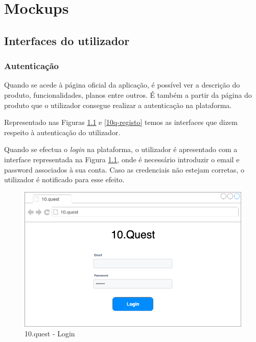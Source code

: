\chapter{Mockups}
\label{a:prototipos}


\section{Interfaces do utilizador}
\label{}

\subsection{Autenticação}

Quando se acede à página oficial da aplicação, é possível ver a descrição do produto, funcionalidades, planos entre outros. É também a partir da página do produto que o utilizador consegue realizar a autenticação na plataforma.

Representado nas Figuras \ref{10q-login} e \ref{10q-registo} temos as interfaces que dizem respeito à autenticação do utilizador.

Quando se efectua o \textit{login} na plataforma, o utilizador é apresentado com a interface representada na Figura \ref{10q-login}, onde é necessário introduzir o email e password associados à sua conta. Caso as credenciais não estejam corretas, o utilizador é notificado para esse efeito.



\begin{figure}[ht!]
	\begin{center}
		\includegraphics[width=1\textwidth]{img/prototipos/1.png}
		\caption{10.quest - Login}
		\label{10q-login}
	\end{center}
\end{figure}


